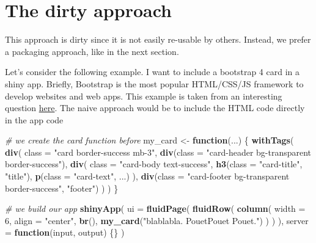 \documentclass[
]{book}
\newenvironment{Shaded}{\begin{snugshade}}{\end{snugshade}}
\newcommand{\CommentTok}[1]{\textcolor[rgb]{0.56,0.35,0.01}{\textit{#1}}}
\newcommand{\ControlFlowTok}[1]{\textcolor[rgb]{0.13,0.29,0.53}{\textbf{#1}}}
\newcommand{\DataTypeTok}[1]{\textcolor[rgb]{0.13,0.29,0.53}{#1}}
\newcommand{\DecValTok}[1]{\textcolor[rgb]{0.00,0.00,0.81}{#1}}
\newcommand{\KeywordTok}[1]{\textcolor[rgb]{0.13,0.29,0.53}{\textbf{#1}}}
\newcommand{\NormalTok}[1]{#1}
\newcommand{\StringTok}[1]{\textcolor[rgb]{0.31,0.60,0.02}{#1}}
\begin{document}
\hypertarget{the-dirty-approach}{%
\section{The dirty approach}\label{the-dirty-approach}}

This approach is dirty since it is not easily re-usable by others. Instead, we prefer a packaging approach, like in the next section.

Let's consider the following example. I want to include a bootstrap 4 card in a shiny app. Briefly, Bootstrap is the most popular HTML/CSS/JS framework to develop websites and web apps. This example is taken from an interesting question \href{https://community.rstudio.com/t/create-a-div-using-htmltools-withtags/22439/2}{here}.
The naive approach would be to include the HTML code directly in the app code

\begin{Shaded}
\begin{Highlighting}[]
\CommentTok{# we create the card function before}
\NormalTok{my_card <-}\StringTok{ }\ControlFlowTok{function}\NormalTok{(...) \{}
  \KeywordTok{withTags}\NormalTok{(}
    \KeywordTok{div}\NormalTok{(}
      \DataTypeTok{class =} \StringTok{"card border-success mb-3"}\NormalTok{,}
      \KeywordTok{div}\NormalTok{(}\DataTypeTok{class =} \StringTok{"card-header bg-transparent border-success"}\NormalTok{),}
      \KeywordTok{div}\NormalTok{(}
        \DataTypeTok{class =} \StringTok{"card-body text-success"}\NormalTok{,}
        \KeywordTok{h3}\NormalTok{(}\DataTypeTok{class =} \StringTok{"card-title"}\NormalTok{, }\StringTok{"title"}\NormalTok{),}
        \KeywordTok{p}\NormalTok{(}\DataTypeTok{class =} \StringTok{"card-text"}\NormalTok{, ...)}
\NormalTok{      ),}
      \KeywordTok{div}\NormalTok{(}\DataTypeTok{class =} \StringTok{"card-footer bg-transparent border-success"}\NormalTok{, }\StringTok{"footer"}\NormalTok{)}
\NormalTok{    )}
\NormalTok{  )}
\NormalTok{\}}

\CommentTok{# we build our app}
\KeywordTok{shinyApp}\NormalTok{(}
  \DataTypeTok{ui =} \KeywordTok{fluidPage}\NormalTok{(}
    \KeywordTok{fluidRow}\NormalTok{(}
      \KeywordTok{column}\NormalTok{(}
        \DataTypeTok{width =} \DecValTok{6}\NormalTok{,}
        \DataTypeTok{align =} \StringTok{"center"}\NormalTok{,}
        \KeywordTok{br}\NormalTok{(),}
        \KeywordTok{my_card}\NormalTok{(}\StringTok{"blablabla. PouetPouet Pouet."}\NormalTok{)}
\NormalTok{      )}
\NormalTok{    )}
\NormalTok{  ),}
  \DataTypeTok{server =} \ControlFlowTok{function}\NormalTok{(input, output) \{\}}
\NormalTok{)}
\end{Highlighting}
\end{Shaded}
\end{document}
